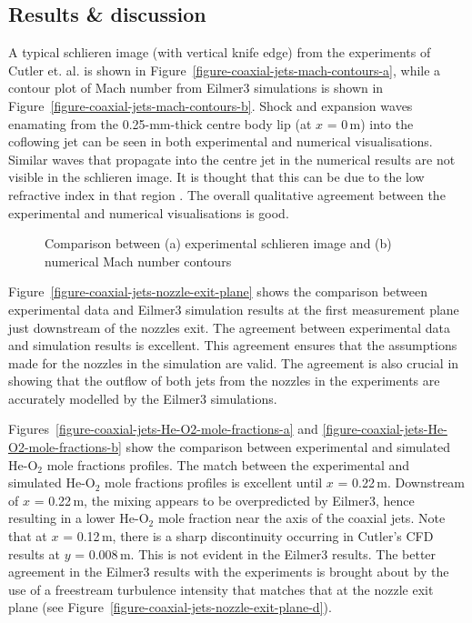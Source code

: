 \subsection{Results \& discussion}
%
A typical schlieren image (with vertical knife edge) from the
experiments of Cutler et. al. \cite{Cutler2006} is shown in Figure~\ref{figure-coaxial-jets-mach-contours-a},
while a contour plot of Mach number from Eilmer3 simulations is
shown in Figure~\ref{figure-coaxial-jets-mach-contours-b}.
Shock and expansion waves enamating from the 0.25-mm-thick centre
body lip (at $x$ = 0\,m) into the coflowing jet can be seen in both 
experimental and numerical visualisations. Similar waves that
propagate into the centre jet in the numerical results are not 
visible in the schlieren image. It is thought that this can be
due to the low refractive index in that region \cite{Cutler2006}.
The overall qualitative agreement between the experimental
and numerical visualisations is good.  
\begin{figure}[h]
 \centering
 \caption{Comparison between (a) experimental schlieren image and 
          (b) numerical Mach number contours}
 \label{figure-coaxial-jets-mach-contours}
\end{figure}

Figure~\ref{figure-coaxial-jets-nozzle-exit-plane} shows the comparison between
experimental data and Eilmer3 simulation results at the first 
measurement plane just downstream of the nozzles exit. The agreement
between experimental data and simulation results is excellent. This agreement 
ensures that the assumptions made for the nozzles in the simulation are valid. 
The agreement is also crucial in showing that the outflow of both jets from 
the nozzles in the experiments are accurately modelled by the Eilmer3 simulations.

Figures~\ref{figure-coaxial-jets-He-O2-mole-fractions-a} and
\ref{figure-coaxial-jets-He-O2-mole-fractions-b} show the comparison
between experimental and simulated He-O$_2$ mole fractions profiles. The 
match between the experimental and simulated He-O$_2$ mole fractions
profiles is excellent until $x$ = 0.22\,m. Downstream of $x$ = 0.22\,m,
the mixing appears to be overpredicted by Eilmer3, hence resulting in a lower
He-O$_2$ mole fraction near the axis of the coaxial jets. Note that at
$x$ = 0.12\,m, there is a sharp discontinuity occurring in Cutler's CFD
results at $y$ = 0.008\,m. This is not evident in the Eilmer3 results.
The better agreement in the Eilmer3 results with the experiments is brought
about by the use of a freestream turbulence intensity that matches that at 
the nozzle exit plane (see Figure~\ref{figure-coaxial-jets-nozzle-exit-plane-d}).

